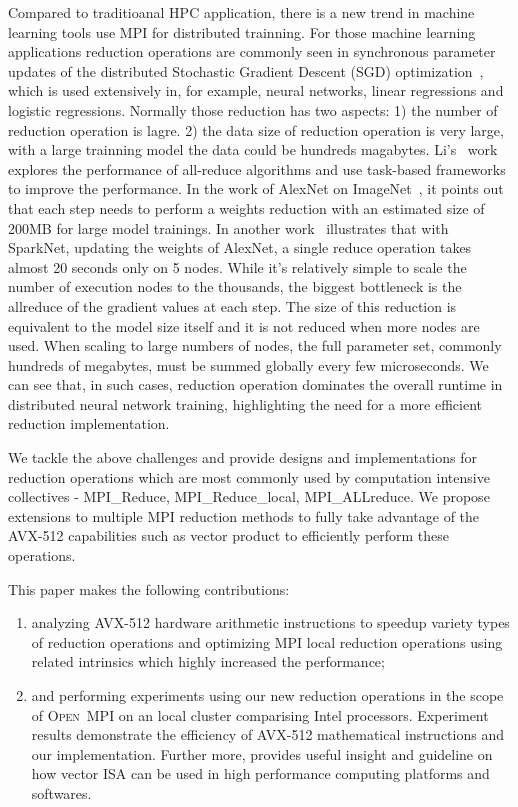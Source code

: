 \documentclass[sigconf]{acmart}
\newcommand{\ompi}[0]{\textsc{Open~MPI}\xspace}
\newcommand{\mpi}[0]{\textsc{MPI}\xspace}
\begin{document}
Compared to traditioanal HPC application, there is a new trend in machine learning tools
use \mpi for distributed trainning. For those machine learning applications reduction operations
are commonly seen in synchronous parameter updates of the distributed Stochastic
Gradient Descent (SGD) optimization~\cite{sgd10}, which is used extensively
in, for example, neural networks, linear regressions and logistic
regressions. Normally those reduction has two aspects: 1) the number of reduction
operation is lagre. 2) the data size of reduction operation is very large, with
a large trainning model the data could be hundreds magabytes.
Li's~\cite{inproceedings} work explores the performance of all-reduce algorithms
and use task-based frameworks to improve the performance.
In the work of AlexNet on ImageNet~\cite{NIPS2012_4824}, it points out that
each step needs to perform a weights reduction with an estimated size
of 200MB for large model trainings. In another work~\cite{moritz2015sparknet}
illustrates that with SparkNet, updating the weights of AlexNet, a single reduce
operation takes almost 20 seconds only on 5 nodes. While it's relatively simple to scale
the number of execution nodes to the thousands, the biggest bottleneck is the allreduce of
the gradient values at each step. The size of this reduction is equivalent
to the model size itself and it is not reduced when more
nodes are used. When scaling to large numbers of nodes, the full parameter set, commonly hundreds of
megabytes, must be summed globally every few microseconds. We can see that, in such cases,
reduction operation dominates the overall runtime in distributed neural network
training, highlighting the need for a more efficient reduction implementation.

We tackle the above challenges and provide designs and implementations
for reduction operations which are most commonly used by computation
intensive collectives - MPI\_Reduce, MPI\_Reduce\_local, MPI\_ALLreduce.
We propose extensions to multiple \mpi reduction methods to fully take
advantage of the AVX-512 capabilities such as vector product to efficiently
perform these operations.

This paper makes the following contributions:
\begin{enumerate}
  \item analyzing AVX-512 hardware arithmetic instructions to speedup variety types of reduction operations and optimizing \mpi local reduction operations using related intrinsics which highly increased the performance;
  \item and performing experiments using our
      new reduction operations in the scope of \ompi on an local cluster comparising Intel processors.
      Experiment results demonstrate the efficiency
      of AVX-512 mathematical instructions and our implementation.
      Further more, provides useful insight and guideline on how vector
      ISA can be used in high performance computing platforms and softwares.
\end{enumerate}
\end{document}
